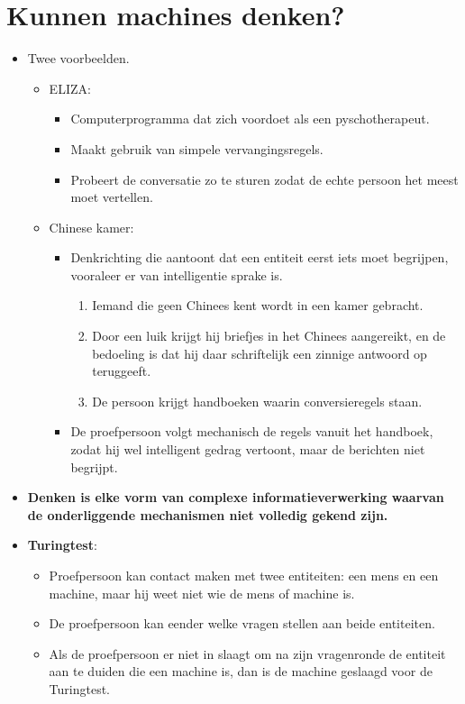 \section{Kunnen machines denken?}
\begin{itemize}
	\item Twee voorbeelden.
	\begin{itemize}
		\item ELIZA:
		\begin{itemize}
			\item Computerprogramma dat zich voordoet als een pyschotherapeut.
			\item Maakt gebruik van simpele vervangingsregels.
			\item Probeert de conversatie zo te sturen zodat de echte persoon het meest moet vertellen.
		\end{itemize} 
		\item Chinese kamer:
		\begin{itemize}
			\item Denkrichting die aantoont dat een entiteit eerst iets moet begrijpen, vooraleer er van intelligentie sprake is. 
			\begin{enumerate}
				\item Iemand die geen Chinees kent wordt in een kamer gebracht.
				\item Door een luik krijgt hij briefjes in het Chinees aangereikt, en de bedoeling is dat hij daar schriftelijk een zinnige antwoord op teruggeeft.
				\item De persoon krijgt handboeken waarin conversieregels staan.
			\end{enumerate}
			\item De proefpersoon volgt mechanisch de regels vanuit het handboek, zodat hij wel intelligent gedrag vertoont, maar de berichten niet begrijpt.
		\end{itemize}
	\end{itemize}
	\item \textbf{Denken is elke vorm van complexe informatieverwerking waarvan de onderliggende mechanismen niet volledig gekend zijn.}
	\item \textbf{Turingtest}:
	\begin{itemize}
		\item Proefpersoon kan contact maken met twee entiteiten: een mens en een machine, maar hij weet niet wie de mens of machine is.
		\item De proefpersoon kan eender welke vragen stellen aan beide entiteiten.
		\item Als de proefpersoon er niet in slaagt om na zijn vragenronde de entiteit aan te duiden die een machine is, dan is de machine geslaagd voor de Turingtest.
	\end{itemize} 
\end{itemize}
